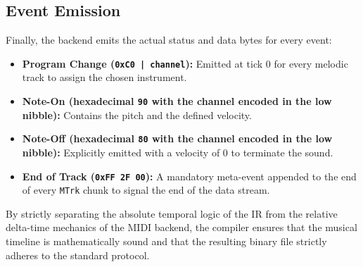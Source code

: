 \subsection{Event Emission}\label{subsec:event-emission}

Finally, the backend emits the actual status and data bytes for every event:
\begin{itemize}
  \item \textbf{Program Change (\texttt{0xC0 | channel}):} Emitted at tick 0 for every melodic track to assign the
    chosen instrument.
  \item \textbf{Note-On (hexadecimal \texttt{90} with the channel encoded in the low nibble):} Contains the pitch and
    the defined velocity.
  \item \textbf{Note-Off (hexadecimal \texttt{80} with the channel encoded in the low nibble):} Explicitly emitted with
    a velocity of 0 to terminate the sound.
  \item \textbf{End of Track (\texttt{0xFF 2F 00}):} A mandatory meta-event appended to the end of every \texttt{MTrk}
    chunk to signal the end of the data stream.
\end{itemize}

By strictly separating the absolute temporal logic of the IR from the relative delta-time mechanics of the MIDI backend,
the compiler ensures that the musical timeline is mathematically sound and that the resulting binary file strictly
adheres to the standard protocol.

